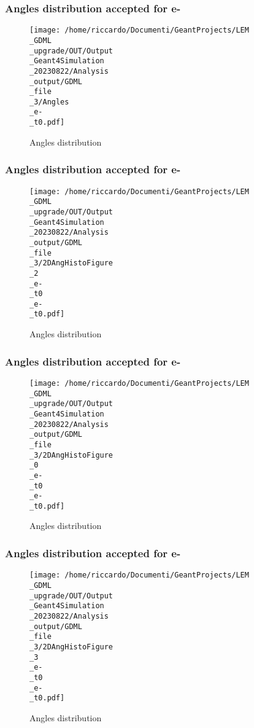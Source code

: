 \documentclass[8pt]{beamer}
\begin{document}
            \begin{frame}
                \frametitle{Angles distribution accepted for e-}
            
        \begin{figure}[h]
            \centering
            \texttt{[image: /home/riccardo/Documenti/GeantProjects/LEM\\\_GDML\\\_upgrade/OUT/Output\\\_Geant4Simulation\\\_20230822/Analysis\\\_output/GDML\\\_file\\\_3/Angles\\\_e-\\\_t0.pdf]}
            \caption{Angles distribution}
        \end{figure}
        
            \end{frame}
            
            \begin{frame}
                \frametitle{Angles distribution accepted for e-}
            
        \begin{figure}[h]
            \centering
            \texttt{[image: /home/riccardo/Documenti/GeantProjects/LEM\\\_GDML\\\_upgrade/OUT/Output\\\_Geant4Simulation\\\_20230822/Analysis\\\_output/GDML\\\_file\\\_3/2DAngHistoFigure\\\_2\\\_e-\\\_t0\\\_e-\\\_t0.pdf]}
            \caption{Angles distribution}
        \end{figure}
        
            \end{frame}
            
            \begin{frame}
                \frametitle{Angles distribution accepted for e-}
            
        \begin{figure}[h]
            \centering
            \texttt{[image: /home/riccardo/Documenti/GeantProjects/LEM\\\_GDML\\\_upgrade/OUT/Output\\\_Geant4Simulation\\\_20230822/Analysis\\\_output/GDML\\\_file\\\_3/2DAngHistoFigure\\\_0\\\_e-\\\_t0\\\_e-\\\_t0.pdf]}
            \caption{Angles distribution}
        \end{figure}
        
            \end{frame}
            
            \begin{frame}
                \frametitle{Angles distribution accepted for e-}
            
        \begin{figure}[h]
            \centering
            \texttt{[image: /home/riccardo/Documenti/GeantProjects/LEM\\\_GDML\\\_upgrade/OUT/Output\\\_Geant4Simulation\\\_20230822/Analysis\\\_output/GDML\\\_file\\\_3/2DAngHistoFigure\\\_3\\\_e-\\\_t0\\\_e-\\\_t0.pdf]}
            \caption{Angles distribution}
        \end{figure}
        
            \end{frame}
            
\end{document}
